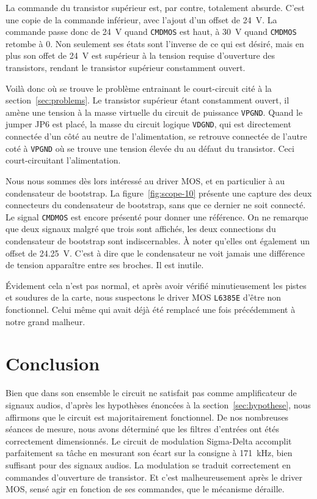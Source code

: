 \documentclass[10pt, oneside, a4paper]{article}
\begin{document}
La commande du transistor supérieur est, par contre, totalement absurde.
C'est une copie de la commande inférieur, avec l'ajout d'un offset de \SI{24}{\volt}.
La commande passe donc de \SI{24}{\volt} quand \texttt{CMDMOS} est haut, à \SI{30}{\volt} quand \texttt{CMDMOS} retombe à 0.
Non seulement ses états sont l'inverse de ce qui est désiré, mais en plus son offet de \SI{24}{\volt} est supérieur à la tension requise d'ouverture des transistors, rendant le transistor supérieur constamment ouvert.

Voilà donc où se trouve le problème entrainant le court-circuit cité à la section~\ref{sec:problems}.
Le transistor supérieur étant constamment ouvert, il amène une tension à la masse virtuelle du circuit de puissance \texttt{VPGND}.
Quand le jumper JP6 est placé, la masse du circuit logique \texttt{VDGND}, qui est directement connectée d'un côté au neutre de l'alimentation, se retrouve connectée de l'autre coté à \texttt{VPGND} où se trouve une tension élevée du au défaut du transistor.
Ceci court-circuitant l'alimentation.

Nous nous sommes dès lors intéressé au driver MOS, et en particulier à au condensateur de bootstrap.
La figure~\ref{fig:scope-10} présente une capture des deux connecteurs du condensateur de bootstrap, sans que ce dernier ne soit connecté.
Le signal \texttt{CMDMOS} est encore présenté pour donner une référence.
On ne remarque que deux signaux malgré que trois sont affichés, les deux connections du condensateur de bootstrap sont indiscernables.
À noter qu'elles ont également un offset de \SI{24.25}{\volt}.
C'est à dire que le condensateur ne voit jamais une différence de tension apparaître entre 
ses broches.
Il est inutile.

Évidement cela n'est pas normal, et après avoir vérifié minutieusement les pistes et soudures de la carte, nous suspectons le driver MOS \texttt{L6385E} d'être non fonctionnel.
Celui même qui avait déjà été remplacé une fois précédemment à notre grand malheur.


\section{Conclusion}
Bien que dans son ensemble le circuit ne satisfait pas comme amplificateur de signaux audios, d'après les hypothèses énoncées à la section~\ref{sec:hypothese}, nous affirmons que le circuit est majoritairement fonctionnel.
De nos nombreuses séances de mesure, nous avons déterminé que les filtres d'entrées ont étés correctement dimensionnés.
Le circuit de modulation Sigma-Delta accomplit parfaitement sa tâche en mesurant son écart sur la consigne à \SI{171}{\kilo\hertz}, bien suffisant pour des signaux audios.
La modulation se traduit correctement en commandes d'ouverture de transistor.
Et c'est malheureusement après le driver MOS, sensé agir en fonction de ses commandes, que le mécanisme déraille.
\end{document}

